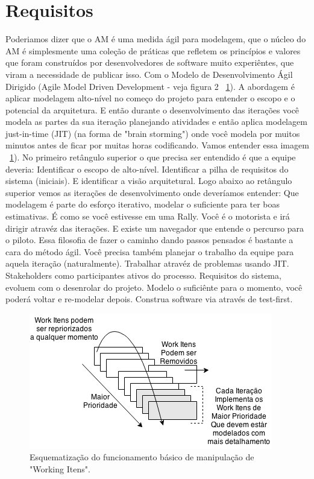 \documentclass[conference]{IEEEtran}
\begin{document}
\section{Requisitos}
Poderiamos dizer que o AM é uma medida ágil para modelagem, que o núcleo do AM é simplesmente uma coleção de práticas que refletem os princípios e valores que foram construídos por desenvolvedores de software muito experiêntes, que viram a necessidade de publicar isso. Com o Modelo de Desenvolvimento Ágil Dirigido (Agile Model Driven Development - veja figura 2 ~\ref{fig:requirements}). A abordagem é aplicar modelagem alto-nível no começo do projeto para entender o escopo e o potencial da arquitetura. E então durante o desenvolvimento das iterações você modela as partes da sua iteração planejando atividades e então aplica modelagem just-in-time (JIT) (na forma de "brain storming") onde você modela por muitos minutos antes de ficar por muitas horas codificando. Vamos entender essa imagem ~\ref{fig:requirements}). No primeiro retângulo superior o que precisa ser entendido é que a equipe deveria: Identificar o escopo de alto-nível. Identificar a pilha de requisitos do sistema (iniciais). E identificar a visão arquitetural. Logo abaixo ao retângulo superior vemos as iterações de desenvolvimento onde deveríamos entender: Que modelagem é parte do esforço iterativo, modelar o suficiente para ter boas estimativas. É como se você estivesse em uma Rally. Você é o motorista e irá dirigir atravéz das iterações. E existe um navegador que entende o percurso para o piloto. Essa filosofia de fazer o caminho dando passos pensados é bastante a cara do método ágil. Você precisa também planejar o trabalho da equipe para aquela iteração (naturalmente). Trabalhar atravéz de problemas usando JIT. Stakeholders como participantes ativos do processo. Requisitos do sistema, evoluem com o desenrolar do projeto. Modelo o suficiênte para o momento, você poderá voltar e re-modelar depois. Construa software via através de test-first.

\begin{figure}[ht]
\includegraphics[scale=0.55]{requirements.png}
\caption{Esquematização do funcionamento básico de manipulação de "Working Itens".}
\label{fig:requirements}
\end{figure}
\end{document}
